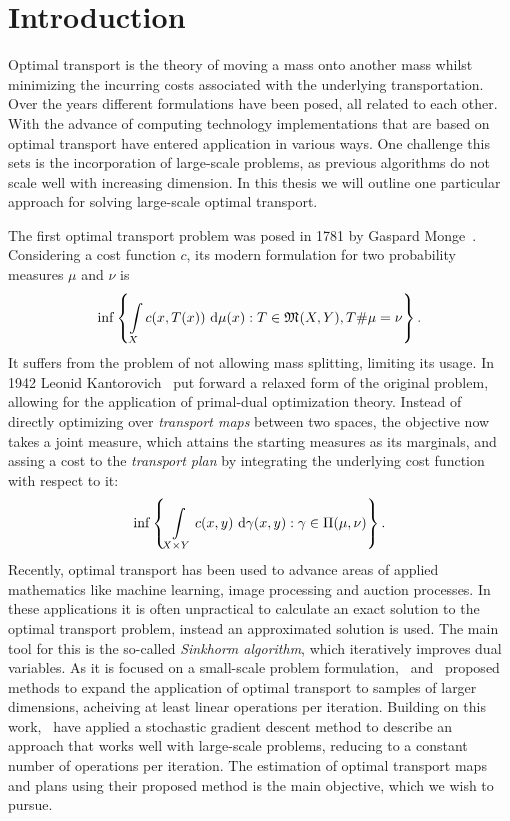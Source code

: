 \chapter*{Introduction}

Optimal transport is the theory of moving a mass onto another mass whilst minimizing the incurring costs associated with the underlying transportation. Over the years different formulations have been posed, all related to each other. With the advance of computing technology implementations that are based on optimal transport have entered application in various ways. One challenge this sets is the incorporation of large-scale problems, as previous algorithms do not scale well with increasing dimension. In this thesis we will outline one particular approach for solving large-scale optimal transport.

The first optimal transport problem was posed in 1781 by Gaspard Monge\ \cite{Mon1781}. Considering a cost function $c$, its modern formulation for two probability measures $\mu$ and $\nu$ is
\[ \inf \left\{ \int\limits_X c(x, T(x))~\Dx{\mu} : T \in \MF{X}{Y}, \push{\mu} = \nu \right\}. \]
It suffers from the problem of not allowing mass splitting, limiting its usage. In 1942 Leonid Kantorovich\ \cite{Kan1942} put forward a relaxed form of the original problem, allowing for the application of primal-dual optimization theory. Instead of directly optimizing over \textit{transport maps} between two spaces, the objective now takes a joint measure, which attains the starting measures as its marginals, and assing a cost to the \textit{transport plan} by integrating the underlying cost function with respect to it:
\[ \inf \left\{ \int\limits_{X \times Y} c(x, y)~\Dx[x, y]{\gamma} : \gamma \in \TP{\mu}{\nu} \right\}. \]
Recently, optimal transport has been used to advance areas of applied mathematics like machine learning, image processing and auction processes. In these applications it is often unpractical to calculate an exact solution to the optimal transport problem, instead an approximated solution is used. The main tool for this is the so-called \textit{Sinkhorm algorithm}, which iteratively improves dual variables. As it is focused on a small-scale problem formulation,\ \cite{Gene2016} and\ \cite{Arjo2017} proposed methods to expand the application of optimal transport to samples of larger dimensions, acheiving at least linear operations per iteration. Building on this work,\ \cite{Seg2018} have applied a stochastic gradient descent method to describe an approach that works well with large-scale problems, reducing to a constant number of operations per iteration. The estimation of optimal transport maps and plans using their proposed method is the main objective, which we wish to pursue.

